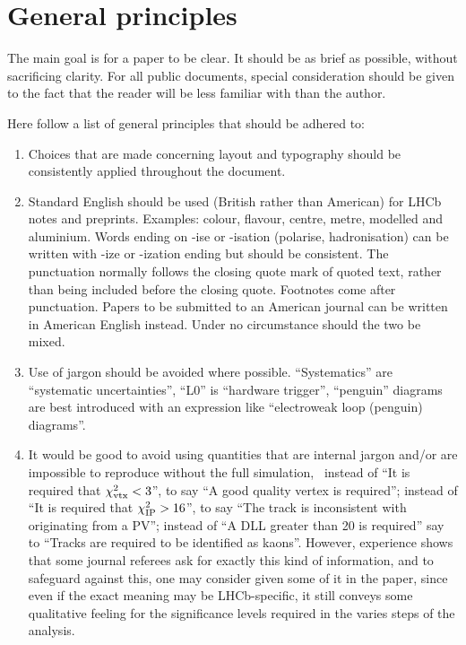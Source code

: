 \section{General principles}

The main goal is for a paper to be clear. It should be as brief as
possible, without sacrificing clarity. For all public documents,
special consideration should be given to the fact that the reader will
be less familiar with \lhcb than the author.

Here follow a list of general principles that should be adhered to:
\begin{enumerate}

\item Choices that are made concerning layout and typography
  should be consistently applied throughout the document.

\item Standard English should be used (British rather than American)
  for LHCb notes and preprints. Examples: colour, flavour, centre,
  metre, modelled and aluminium. Words ending on -ise or -isation
  (polarise, hadronisation) can be written with -ize or -ization ending but should be consistent.
  The punctuation normally follows the closing quote mark of quoted text, 
  rather than being included before the closing quote.
  Footnotes come after punctuation. 
  Papers to be submitted to an American journal can be written in American
  English instead. Under no circumstance should the two be mixed.

\item Use of jargon should be avoided where possible. ``Systematics'' are ``systematic
  uncertainties'', ``L0'' is ``hardware trigger'', ``penguin'' diagrams
  are best introduced with an expression like ``electroweak loop (penguin) diagrams''.

\item It would be good to avoid using quantities that are internal jargon and/or 
  are impossible to reproduce without the full simulation, \ie\ instead of ``It is 
  required that $\chi^2_{\text{vtx}}<3$'', to say ``A good quality vertex is required''; 
  instead of ``It is required that $\chi^2_{\text{IP}}>16$'', to say ``The track is 
  inconsistent with originating from a PV''; instead of ``A DLL greater 
  than 20 is required'' say to ``Tracks are required to be identified as kaons''.
  However, experience shows that some journal referees ask for exactly this 
  kind of information, and to safeguard against this, one may consider given 
  some of it in the paper, since even if the exact meaning may be LHCb-specific, 
  it still conveys some qualitative feeling for the significance levels required 
  in the varies steps of the analysis.   
 

\end{enumerate}
